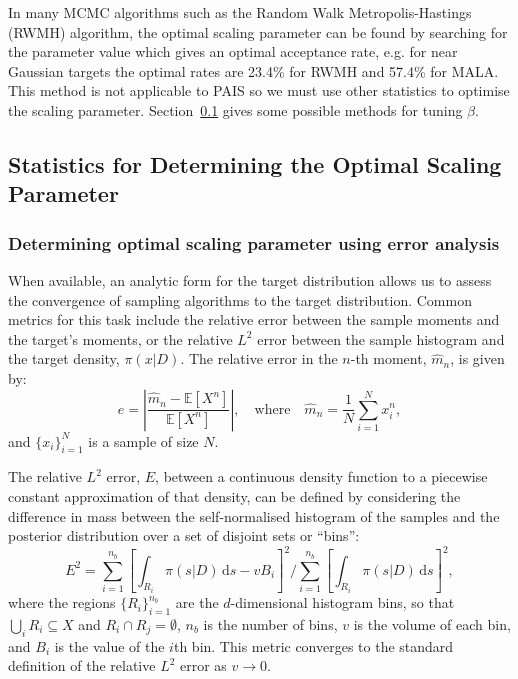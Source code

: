 \documentclass[final]{siamltex}
\begin{document}
In many MCMC algorithms such as the Random Walk Metropolis-Hastings
(RWMH) algorithm, the optimal scaling parameter can be found by
searching for the parameter value which gives an optimal acceptance
rate, e.g. for near Gaussian targets the optimal rates are 23.4\% for
RWMH and 57.4\% for MALA\cite{roberts2001optimal}. This method
is not applicable to PAIS so we must use other statistics to optimise
the scaling parameter. Section~\ref{sec:statistics} gives some
possible methods for tuning $\beta$.


\subsection{Statistics for Determining the Optimal Scaling Parameter}\label{sec:statistics}

\subsubsection{Determining optimal scaling parameter using error analysis}

When available, an analytic form for the target distribution allows us
to assess the convergence of sampling algorithms to the target
distribution. Common metrics for this task include the relative error
between the sample moments and the target's moments, or the
relative $L^2$ error between the sample histogram and the target
density, $\pi(x|D)$. The relative error in the $n$-th moment,
$\hat{m}_n$, is given by:
\begin{equation}\label{eq:34567}
	e = \left|\frac{\hat{m}_n - \mathbb{E}[X^n]}{\mathbb{E}[X^n]}\right|, \quad \text{where} \quad \hat{m}_n = \frac{1}{N}\sum_{i=1}^N \! x_i^n,
\end{equation}
and $\{x_i\}_{i=1}^N$ is a sample of size $N$.

The relative $L^2$ error, $E$, between a continuous density function to a
piecewise constant approximation of that density, can be defined by considering the
difference in mass between the self-normalised histogram of the
samples and the posterior distribution over a set of disjoint sets or
``bins'':
\begin{equation}\label{eqn:L2_error}
	E^2 = \sum\limits_{i=1}^{n_b}\left[\displaystyle\int_{R_i} \! \pi(s|D) \, \mbox{d}s - vB_i\right]^2 \Big/ \sum\limits_{i=1}^{n_b}\left[\displaystyle\int_{R_i} \! \pi(s|D) \, \mbox{d}s\right]^2,
\end{equation}
where the regions $\{R_i\}_{i=1}^{n_b}$ are the $d$-dimensional
histogram bins, so that $\bigcup_i R_i \subseteq X$ and
$R_i\cap R_j=\emptyset$, $n_b$ is the number of bins, $v$ is the
volume of each bin, and $B_i$ is the value of the $i$th bin. This
metric converges to the standard definition of the relative $L^2$
error as $v\rightarrow 0$.
\end{document}
